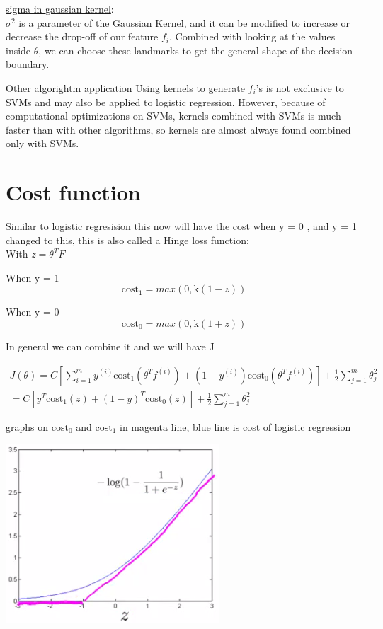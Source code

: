 \documentclass[30pt]{article}
\begin{document}
{\underline{sigma in gaussian kernel}:\\
$\sigma^2$ is a parameter of the Gaussian Kernel, and it can be modified to
increase or decrease the drop-off of our feature $f_i$. Combined with
looking at the values inside $\theta$, we can choose these landmarks to get the
general shape of the decision boundary.

\underline{Other algorightm application}
Using kernels to generate $f_i$'s is not exclusive to SVMs and may also be applied
to logistic regression. However, because of computational optimizations on
SVMs, kernels combined with SVMs is much faster than with other algorithms, so
kernels are almost always found combined only with SVMs.

\section{Cost function}
Similar to logistic regresision this now will have the cost when y = 0 , and y = 1 
changed to this, this is also called a Hinge loss function: \\
With $z = \theta^TF$

When y = 1
\begin{equation}
	\text{cost}_1 = max(0,\text{k}(1 - z))
\end{equation}

When y = 0
\begin{equation}
	\text{cost}_0 = max(0,\text{k}(1 + z))
\end{equation}

In general we can combine it and we will have J

\begin{multline}
	J(\theta) = C[\sum_{i=1}^{m} y^{(i)}\text{cost}_1(\theta^Tf^{(i)}) + (1 - y^{(i)})\text{cost}_0(\theta^Tf^{(i)})] + \frac{1}{2} \sum_{j=1}^m \theta_j ^ 2\\
	= C [y^T \text{cost}_1(z) + (1 - y)^T \text{cost}_0(z)] + \frac{1}{2} \sum_{j=1}^m \theta_j ^ 2
\end{multline}

graphs on $\text{cost}_0$ and $\text{cost}_1$ in magenta line, blue line is cost
of logistic regression

\includegraphics[scale=0.9]{cost_0.png}

}
\end{document}
